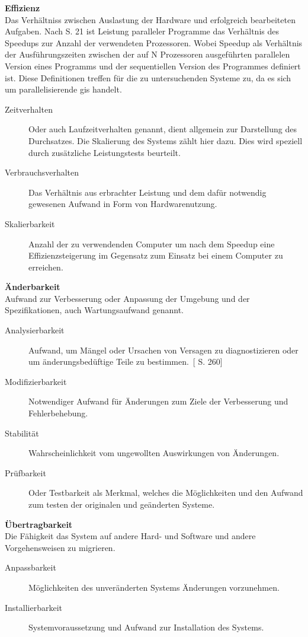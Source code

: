 \textbf{Effizienz}\\
Das Verhältniss zwischen Auslastung der Hardware und erfolgreich bearbeiteten Aufgaben. Nach \cite{book:Leistungsanalyse} S. 21 ist Leistung paralleler Programme das Verhältnis des Speedups zur Anzahl der verwendeten Prozessoren. Wobei Speedup als Verhältnis der Ausführungszeiten zwischen der auf N Prozessoren ausgeführten parallelen Version eines Programms und der sequentiellen Version des Programmes definiert ist. Diese Definitionen treffen für die zu untersuchenden Systeme zu, da es sich um parallelisierende \Gls{gis} handelt.
\begin{description}
\item[Zeitverhalten] Oder auch Laufzeitverhalten genannt, dient allgemein zur Darstellung des Durchsatzes. Die Skalierung des Systems zählt hier dazu. Dies wird speziell durch zusätzliche Leistungstests beurteilt.
\item[Verbrauchsverhalten] Das Verhältnis aus erbrachter Leistung und dem dafür notwendig gewesenen Aufwand in Form von Hardwarenutzung.
\item[Skalierbarkeit] Anzahl der zu verwendenden Computer um nach dem Speedup eine Effizienzsteigerung im Gegensatz zum Einsatz bei einem Computer zu erreichen.
\end{description}



\textbf{Änderbarkeit}\\
Aufwand zur Verbesserung oder Anpassung der Umgebung und der Spezifikationen, auch Wartungsaufwand genannt.
\begin{description}
\item[Analysierbarkeit] \glqq Aufwand, um Mängel oder Ursachen von Versagen zu diagnostizieren oder um änderungsbedüftige Teile zu bestimmen.\grqq\ [\cite{book:lehrbuchsoftware} S. 260]
\item[Modifizierbarkeit] Notwendiger Aufwand für Änderungen zum Ziele der Verbesserung und Fehlerbehebung.
\item[Stabilität] Wahrscheinlichkeit vom ungewollten Auswirkungen von Änderungen.
\item[Prüfbarkeit] Oder Testbarkeit als Merkmal, welches die Möglichkeiten und den Aufwand zum testen der originalen und geänderten Systeme.
\end{description}



\textbf{Übertragbarkeit}\\
Die Fähigkeit das System auf andere Hard- und Software und andere Vorgehensweisen zu migrieren.
\begin{description}
\item[Anpassbarkeit] Möglichkeiten des unveränderten Systems Änderungen vorzunehmen.
\item[Installierbarkeit] Systemvoraussetzung und Aufwand zur Installation des Systems.
\end{description}



